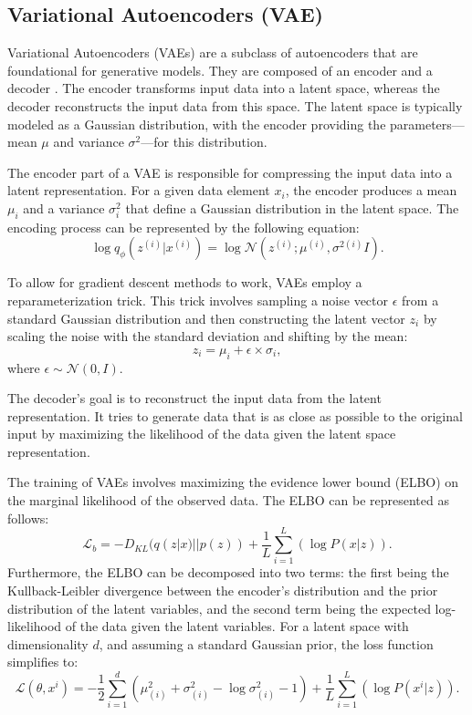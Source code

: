 \documentclass[11pt,a4paper,oneside]{report}
\begin{document}
\subsection{Variational Autoencoders (VAE)}

Variational Autoencoders (VAEs) are a subclass of autoencoders that are foundational for generative models. They are composed of an encoder and a decoder \cite{cho2014properties}. The encoder transforms input data into a latent space, whereas the decoder reconstructs the input data from this space. The latent space is typically modeled as a Gaussian distribution, with the encoder providing the parameters—mean $\mu$ and variance $\sigma^2$—for this distribution.

The encoder part of a VAE is responsible for compressing the input data into a latent representation. For a given data element $x_i$, the encoder produces a mean $\mu_i$ and a variance $\sigma^2_i$ that define a Gaussian distribution in the latent space. The encoding process can be represented by the following equation:
\begin{equation}
\log q_{\phi} \left( z^{(i)} | x^{(i)} \right) = \log \mathcal{N} \left( z^{(i)}; \mu^{(i)}, \sigma^{2(i)} I \right).
\end{equation}

To allow for gradient descent methods to work, VAEs employ a reparameterization trick. This trick involves sampling a noise vector $\epsilon$ from a standard Gaussian distribution and then constructing the latent vector $z_i$ by scaling the noise with the standard deviation and shifting by the mean:
\begin{equation}
z_i = \mu_i + \epsilon \times \sigma_i,
\end{equation}
where $\epsilon \sim \mathcal{N}(0, I)$.

The decoder's goal is to reconstruct the input data from the latent representation. It tries to generate data that is as close as possible to the original input by maximizing the likelihood of the data given the latent space representation.

The training of VAEs involves maximizing the evidence lower bound (ELBO) on the marginal likelihood of the observed data. The ELBO can be represented as follows:
\begin{equation}
\mathcal{L}_b = -D_{KL}(q(z|x)||p(z)) + \frac{1}{L} \sum_{i=1}^{L}(\log P(x|z)).
\end{equation}
Furthermore, the ELBO can be decomposed into two terms: the first being the Kullback-Leibler divergence between the encoder's distribution and the prior distribution of the latent variables, and the second term being the expected log-likelihood of the data given the latent variables. For a latent space with dimensionality $d$, and assuming a standard Gaussian prior, the loss function simplifies to:
\begin{equation}
\mathcal{L}(\theta, x^i) = -\frac{1}{2} \sum_{i=1}^{d} \left( \mu^{2}_{(i)} + \sigma^{2}_{(i)} - \log \sigma^{2}_{(i)} - 1 \right) + \frac{1}{L} \sum_{i=1}^{L} \left( \log P(x^{i} | z) \right).
\end{equation}
\end{document}
